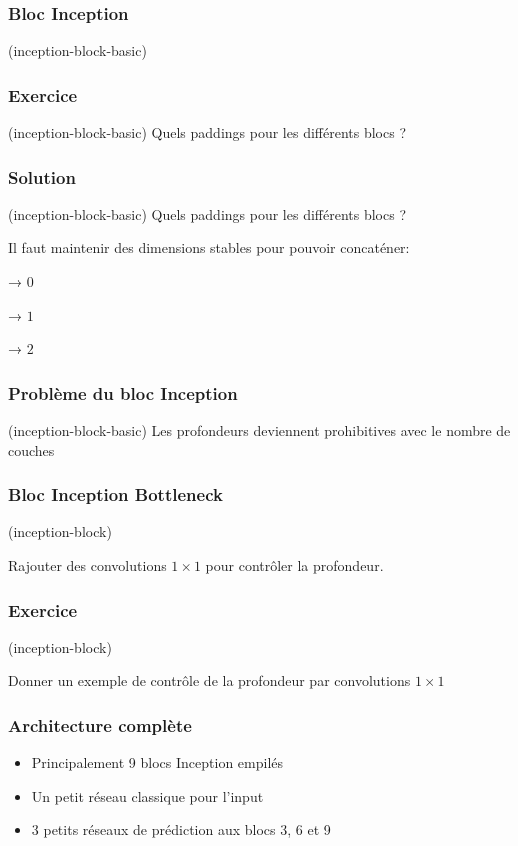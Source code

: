 \documentclass{formation}
\begin{document}
\begin{frame}
  \frametitle{Bloc Inception}
   (inception-block-basic)
\end{frame}

\begin{frame}
  \frametitle{Exercice}
   (inception-block-basic)
  Quels paddings pour les différents blocs ?
\end{frame}

\begin{frame}
  \frametitle{Solution}
   (inception-block-basic)
  Quels paddings pour les différents blocs ?

  Il faut maintenir des dimensions stables pour pouvoir concaténer:
  \pause
  \begin{description}[<+->]
  \item[$1 \times 1$] → $0$
  \item[$3 \times 3$] → $1$
  \item[$5 \times 5$] → $2$
  \end{description}
\end{frame}

\begin{frame}
  \frametitle{Problème du bloc Inception}
   (inception-block-basic)
  Les profondeurs deviennent prohibitives avec le nombre de couches
\end{frame}

\begin{frame}
  \frametitle{Bloc Inception \og Bottleneck\fg}
   (inception-block)

  Rajouter des convolutions $1 \times 1$ pour contrôler la profondeur.
\end{frame}

\begin{frame}
  \frametitle{Exercice}
   (inception-block)

  Donner un exemple de contrôle de la profondeur par convolutions $1
  \times 1$
\end{frame}

\begin{frame}
  \frametitle{Architecture complète}
  \begin{itemize}
  \item Principalement 9 blocs Inception empilés
    
  \item Un \og petit\fg{} réseau classique pour l'input
  \item 3 \og petits \fg{} réseaux de prédiction aux blocs 3, 6 et 9
  \end{itemize}
\end{frame}
\end{document}
